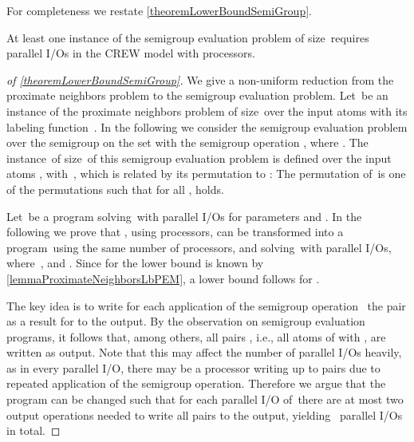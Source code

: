 \documentclass[envcountsame]{llncs}
\def\bOm#1{\printmath{\Omega \left(#1\right)}}
\begin{document}
For completeness we restate \autoref{theoremLowerBoundSemiGroup}.

\begin{theorem}
\label{theoremLowerBoundSemiGroupRestate} 
At least one instance of the semigroup evaluation problem of size~ requires \bOm{\permp{\inputSize,\memorySize,\blockSize}} parallel I/Os in the CREW \semigroupPEM model with  processors.
\end{theorem}


\begin{proof}[of \autoref{theoremLowerBoundSemiGroup}]
We give a non-uniform reduction from the proximate neighbors problem to the semigroup evaluation problem.
Let~\instPN be an instance of the proximate neighbors problem of size~ over the input atoms \mbox{} with its labeling function~\labf.
In the following we consider the semigroup evaluation problem over the semigroup on the set  with the semigroup operation , where .
The instance~\instSE of size~ of this semigroup evaluation problem is defined over the input atoms , with~\mbox{}, which is related by its permutation to \instPN: The permutation \perm{} of~\instSE is one of the permutations such that for all ,  holds.

Let~\progSE be a program solving~\instSE with \tSE{} parallel I/Os for parameters \MSE and \BSE.
In the following we prove that \progSE, using  processors, can be transformed into a program~\progPN  using the same number of processors, and solving~\instPN with  parallel I/Os, where~\mbox{}, and .
Since for \tPN the lower bound is known by \autoref{lemmaProximateNeighborsLbPEM}, a lower bound follows for \tSE.

The key idea is to write for each application of the semigroup \linebreak oper\-ation~\mbox{} the pair  as a result for \instPN to the output. 
By the observation on semigroup evaluation programs, it follows that, among others, all pairs , i.e., all atoms of \instPN with , are written as output.
Note that this may affect the number of parallel I/Os heavily, as in every parallel I/O, there may be a processor writing up to  pairs due to repeated application of the semigroup operation.
Therefore we argue that the program can be changed such that for each parallel I/O of~\progSE there are at most two output operations needed to write all pairs to the output, yielding~\mbox{} parallel I/Os in total.


\end{proof}
\end{document}
